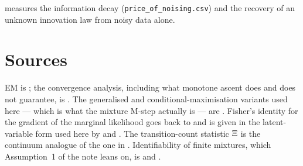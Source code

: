 \begin{codebox}
 measures the information decay
(\texttt{price\_of\_noising.csv}) and the recovery of an unknown innovation law from noisy data
alone.
\end{codebox}

\section*{Sources}
EM is \citet{dempster1977}; the convergence analysis, including what monotone ascent does and
does not guarantee, is \citet{wu1983}. The generalised and conditional-maximisation variants
used here --- which is what the mixture M-step actually is --- are \citet{meng1993}. Fisher's
identity for the gradient of the marginal likelihood goes back to \citet{fisher1925} and is
given in the latent-variable form used here by \citet{louis1982} and \citet{cappe2005}. The
transition-count statistic $\Xi$ is the continuum analogue of the one in \citet{baum1970}.
Identifiability of finite mixtures, which Assumption~1 of the note leans on, is
\citet{teicher1963} and \citet{yakowitz1968}.
